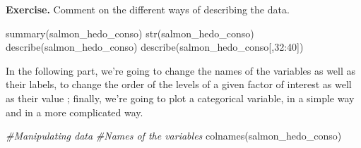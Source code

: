 \documentclass[
]{book}
\newenvironment{Shaded}{\begin{snugshade}}{\end{snugshade}}
\newcommand{\CommentTok}[1]{\textcolor[rgb]{0.56,0.35,0.01}{\textit{#1}}}
\newcommand{\DecValTok}[1]{\textcolor[rgb]{0.00,0.00,0.81}{#1}}
\newcommand{\FunctionTok}[1]{\textcolor[rgb]{0.00,0.00,0.00}{#1}}
\newcommand{\NormalTok}[1]{#1}
\newcommand{\SpecialCharTok}[1]{\textcolor[rgb]{0.00,0.00,0.00}{#1}}
\begin{document}
\textbf{Exercise. }Comment on the different ways of describing the data.

\begin{Shaded}
\begin{Highlighting}[]
\FunctionTok{summary}\NormalTok{(salmon\_hedo\_conso)}
\FunctionTok{str}\NormalTok{(salmon\_hedo\_conso)}
\FunctionTok{describe}\NormalTok{(salmon\_hedo\_conso)}
\FunctionTok{describe}\NormalTok{(salmon\_hedo\_conso[,}\DecValTok{32}\SpecialCharTok{:}\DecValTok{40}\NormalTok{])}
\end{Highlighting}
\end{Shaded}

In the following part, we're going to change the names of the variables as well as their labels, to change the order of the levels of a given factor of interest as well as their value ; finally, we're going to plot a categorical variable, in a simple way and in a more complicated way.

\begin{Shaded}
\begin{Highlighting}[]
\CommentTok{\#Manipulating data}
\CommentTok{\#Names of the variables}
\FunctionTok{colnames}\NormalTok{(salmon\_hedo\_conso)}
\end{Highlighting}
\end{Shaded}
\end{document}
